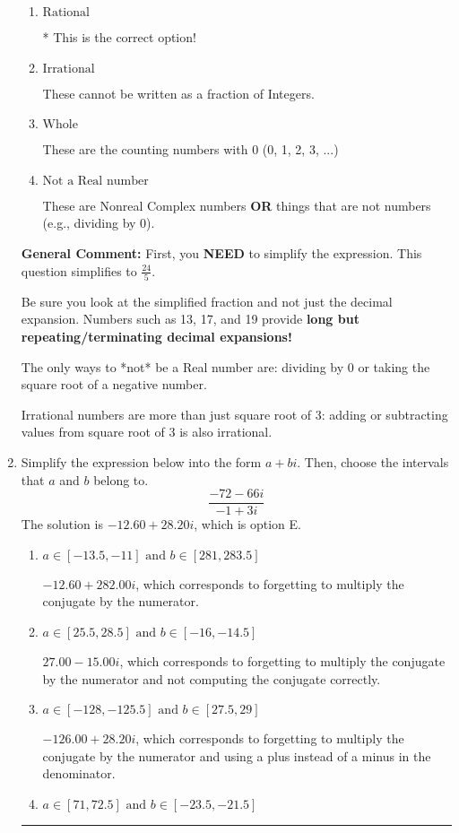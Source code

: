 \documentclass{extbook}[14pt]
\newcommand{\litem}[1]{\item #1

\rule{\textwidth}{0.4pt}}
\begin{document}
\begin{enumerate}
{\begin{enumerate}[label=\Alph*.]
These are the negative and positive counting numbers (..., -3, -2, -1, 0, 1, 2, 3, ...)
\item \( \text{Rational} \)

* This is the correct option!
\item \( \text{Irrational} \)

These cannot be written as a fraction of Integers.
\item \( \text{Whole} \)

These are the counting numbers with 0 (0, 1, 2, 3, ...)
\item \( \text{Not a Real number} \)

These are Nonreal Complex numbers \textbf{OR} things that are not numbers (e.g., dividing by 0).
\end{enumerate}

\textbf{General Comment:} First, you \textbf{NEED} to simplify the expression. This question simplifies to $\frac{24}{5}$. 
 
 Be sure you look at the simplified fraction and not just the decimal expansion. Numbers such as 13, 17, and 19 provide \textbf{long but repeating/terminating decimal expansions!} 
 
 The only ways to *not* be a Real number are: dividing by 0 or taking the square root of a negative number. 
 
 Irrational numbers are more than just square root of 3: adding or subtracting values from square root of 3 is also irrational.
}
\litem{
Simplify the expression below into the form $a+bi$. Then, choose the intervals that $a$ and $b$ belong to.
\[ \frac{-72 - 66 i}{-1 + 3 i} \]
The solution is \( -12.60  + 28.20 i \), which is option E.\begin{enumerate}[label=\Alph*.]
\item \( a \in [-13.5, -11] \text{ and } b \in [281, 283.5] \)

 $-12.60  + 282.00 i$, which corresponds to forgetting to multiply the conjugate by the numerator.
\item \( a \in [25.5, 28.5] \text{ and } b \in [-16, -14.5] \)

 $27.00  - 15.00 i$, which corresponds to forgetting to multiply the conjugate by the numerator and not computing the conjugate correctly.
\item \( a \in [-128, -125.5] \text{ and } b \in [27.5, 29] \)

 $-126.00  + 28.20 i$, which corresponds to forgetting to multiply the conjugate by the numerator and using a plus instead of a minus in the denominator.
\item \( a \in [71, 72.5] \text{ and } b \in [-23.5, -21.5] \)


\end{enumerate}}
\end{enumerate}
\end{document}
